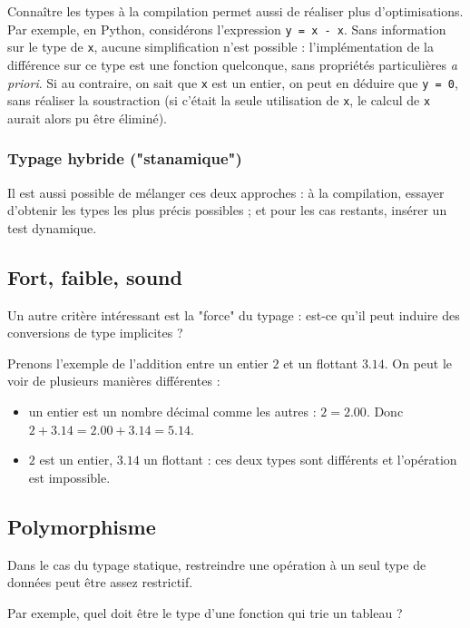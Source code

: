 Connaître les types à la compilation permet aussi de réaliser plus
d'optimisations. Par exemple, en Python, considérons l'expression \texttt{y = x
- x}. Sans information sur le type de \texttt{x}, aucune simplification n'est
possible : l'implémentation de la différence sur ce type est une fonction
quelconque, sans propriétés particulières \emph{a priori}. Si au contraire, on
sait que \texttt{x} est un entier, on peut en déduire que \texttt{y = 0}, sans
réaliser la soustraction (si c'était la seule utilisation de \texttt{x}, le
calcul de \texttt{x} aurait alors pu être éliminé).

\subsubsection{Typage hybride ("stanamique")}

Il est aussi possible de mélanger ces deux approches : à la compilation, essayer
d'obtenir les types les plus précis possibles ; et pour les cas restants,
insérer un test dynamique.

\subsection{Fort, faible, sound}

Un autre critère intéressant est la "force" du typage : est-ce qu'il peut
induire des conversions de type implicites ?

Prenons l'exemple de l'addition entre un entier $2$ et un flottant $3.14$. On
peut le voir de plusieurs manières différentes :

\begin{itemize}
\item
  un entier est un nombre décimal comme les autres : $2 = 2.00$. Donc
  $2 + 3.14 = 2.00 + 3.14 = 5.14$.
\item
  $2$ est un entier, $3.14$ un flottant : ces deux types sont différents et
  l'opération est impossible.
\end{itemize}

\subsection{Polymorphisme}

Dans le cas du typage statique, restreindre une opération à un seul type de
données peut être assez restrictif.

Par exemple, quel doit être le type d'une fonction qui trie un tableau ?


